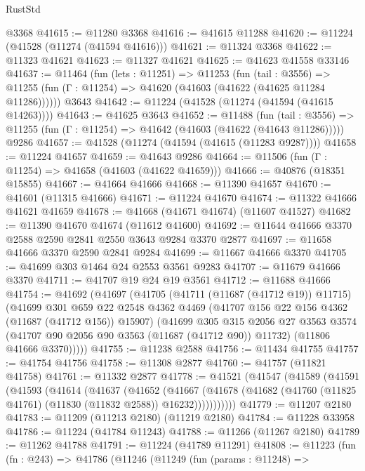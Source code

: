 \begin{lexlean}{RustStd}
\begin{coremodule}
    @3368
@41615 := @11280 @3368
@41616 := @41615 @11288
@41620 := @11224 (@41528 (@11274 (@41594 @41616)))
@41621 := @11324 @3368
@41622 := @11323 @41621
@41623 := @11327 @41621
@41625 := @41623 @41558 @33146
@41637 := @11464
    (fun (lets : @11251) =>
    @11253
      (fun (tail : @3556) =>
      @11255 (fun (Γ : @11254) => @41620 (@41603 (@41622 (@41625 @11284 @11286))))))
    @3643
@41642 := @11224 (@41528 (@11274 (@41594 (@41615 @14263))))
@41643 := @41625 @3643
@41652 := @11488
    (fun (tail : @3556) => @11255 (fun (Γ : @11254) => @41642 (@41603 (@41622 (@41643 @11286)))))
    @9286
@41657 := @41528 (@11274 (@41594 (@41615 (@11283 @9287))))
@41658 := @11224 @41657
@41659 := @41643 @9286
@41664 := @11506 (fun (Γ : @11254) => @41658 (@41603 (@41622 @41659)))
@41666 := @40876 (@18351 @15855)
@41667 := @41664 @41666
@41668 := @11390 @41657
@41670 := @41601 (@11315 @41666)
@41671 := @11224 @41670
@41674 := @11322 @41666 @41621 @41659
@41678 := @41668 (@41671 @41674) (@11607 @41527)
@41682 := @11390 @41670 @41674 (@11612 @41600)
@41692 := @11644 @41666 @3370 @2588 @2590 @2841 @2550 @3643 @9284 @3370 @2877
@41697 := @11658 @41666 @3370 @2590 @2841 @9284
@41699 := @11667 @41666 @3370
@41705 := @41699 @303 @1464 @24 @2553 @3561 @9283
@41707 := @11679 @41666 @3370
@41711 := @41707 @19 @24 @19 @3561
@41712 := @11688 @41666
@41754 := @41692
    (@41697
      (@41705
        (@41711 (@11687 (@41712 @19)) @11715)
        (@41699
          @301
          @659
          @22
          @2548
          @4362
          @4469
          (@41707 @156 @22 @156 @4362 (@11687 (@41712 @156)) @15907)
          (@41699
            @305
            @315
            @2056
            @27
            @3563
            @3574
            (@41707 @90 @2056 @90 @3563 (@11687 (@41712 @90)) @11732)
            (@11806 @41666 @3370)))))
@41755 := @11238 @2588
@41756 := @11434 @41755
@41757 := @41754 @41756
@41758 := @11308 @2877
@41760 := @41757 (@11821 @41758)
@41761 := @11332 @2877
@41778 := @41521
    (@41547
      (@41589
        (@41591
          (@41593
            (@41614
              (@41637
                (@41652
                  (@41667
                    (@41678
                      (@41682 (@41760 (@11825 @41761) (@11830 (@11832 @2588)) @16232)))))))))))
@41779 := @11207 @2180
@41783 := @11209 (@11213 @2180) (@11219 @2180)
@41784 := @11228 @33958
@41786 := @11224 (@41784 @11243)
@41788 := @11266 (@11267 @2180)
@41789 := @11262 @41788
@41791 := @11224 (@41789 @11291)
@41808 := @11223
    (fun (fn : @243) =>
    @41786
      (@11246
        (@11249
          (fun (params : @11248) =>

\end{coremodule}
\end{lexlean}
